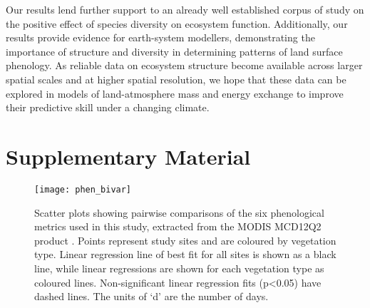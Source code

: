 \documentclass[11pt,a4paper]{article}
\newcommand{\beginsupplement}{%
	\setcounter{table}{0}
	\renewcommand{\thetable}{S\arabic{table}}%
	\setcounter{figure}{0}
	\renewcommand{\thefigure}{S\arabic{figure}}%
	}
\begin{document}
Our results lend further support to an already well established corpus of study
on the positive effect of species diversity on ecosystem function.
Additionally, our results provide evidence for earth-system modellers,
demonstrating the importance of structure and diversity in determining patterns
of land surface phenology. As reliable data on ecosystem structure become
available across larger spatial scales and at higher spatial resolution, we
hope that these data can be explored in models of land-atmosphere mass and
energy exchange to improve their predictive skill under a changing climate.

\printbibliography

\section{Supplementary Material}
\beginsupplement

\begin{figure}[H]
\centering
	\texttt{[image: phen\_bivar]}
	\caption{Scatter plots showing pairwise comparisons of the six phenological
		metrics used in this study, extracted from the MODIS MCD12Q2 product
		\citep{MCD12Q2}. Points represent study sites and are coloured by vegetation
		type. Linear regression line of best fit for all sites is shown as a black
		line, while linear regressions are shown for each vegetation type as coloured
		lines. Non-significant linear regression fits (p<0.05) have dashed lines. The
		units of `d' are the number of days.}
	\label{phen_bivar}
\end{figure}

\begin{landscape}

\end{landscape}
\end{document}
